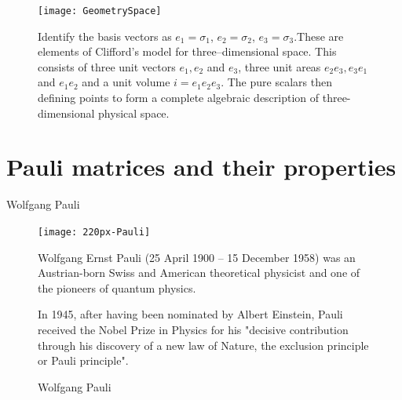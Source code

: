 \documentclass[10pt]{beamer}
\newcommand{\iGA}{{i}}
\begin{document}
\begin{frame}[shrink=25]{}

\begin{figure}[htb]
\begin{center}
\texttt{[image: GeometrySpace]}
\end{center}
\caption{Identify the basis vectors as $e_1 = \sigma_1$, $e_2 = \sigma_2$, $e_3 = \sigma_3$.These are elements of Clifford's model for three--dimensional space. This consists of three unit vectors $ e_1, e_2 $ and $ e_3 $, three unit areas $ e_2 e_3, e_3 e_1 $ and $ e_1 e_2 $ and a unit volume $ \iGA = e_1 e_2 e_3 $. The pure scalars then defining points to form a complete algebraic description of three-dimensional physical space. \label{ThreeSpace}}
\end{figure}
\end{frame}
 \section{Pauli matrices and their properties}
 
 
\begin{frame}[shrink=10]{Wolfgang Pauli}
\begin{figure}[htb]

\begin{center}
\texttt{[image: 220px-Pauli]}
\end{center}

\caption{Wolfgang Pauli}

Wolfgang Ernst Pauli (25 April 1900 -- 15 December 1958) was an Austrian-born Swiss and American theoretical physicist and one of the pioneers of quantum physics. 

In 1945, after having been nominated by Albert Einstein, Pauli received the Nobel Prize in Physics for his "decisive contribution through his discovery of a new law of Nature, the exclusion principle or Pauli principle". 

\end{figure}

\end{frame}
\end{document}
